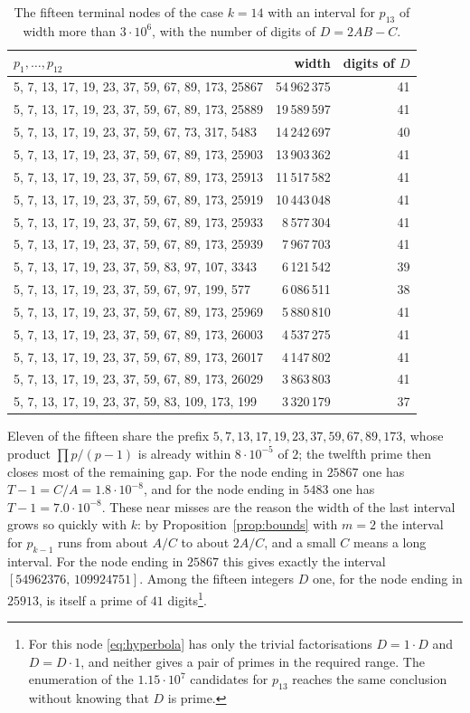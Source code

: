 \documentclass[11pt,reqno]{amsart}
\numberwithin{equation}{section}
\theoremstyle{plain}
\theoremstyle{definition}
\theoremstyle{remark}
\begin{document}
\begin{table}[ht]
\centering
\caption{The fifteen terminal nodes of the case $k=14$ with an interval
for $p_{13}$ of width more than $3\cdot10^6$, with the number of digits
of $D=2AB-C$.}
\label{tab:hard}
\smallskip
\small
\begin{tabular}{@{}lrr@{}}
\toprule
$p_1,\dots,p_{12}$ & width & digits of $D$ \\
\midrule
5, 7, 13, 17, 19, 23, 37, 59, 67, 89, 173, 25867  & 54\,962\,375 & 41 \\
5, 7, 13, 17, 19, 23, 37, 59, 67, 89, 173, 25889  & 19\,589\,597 & 41 \\
5, 7, 13, 17, 19, 23, 37, 59, 67, 73, 317, 5483   & 14\,242\,697 & 40 \\
5, 7, 13, 17, 19, 23, 37, 59, 67, 89, 173, 25903  & 13\,903\,362 & 41 \\
5, 7, 13, 17, 19, 23, 37, 59, 67, 89, 173, 25913  & 11\,517\,582 & 41 \\
5, 7, 13, 17, 19, 23, 37, 59, 67, 89, 173, 25919  & 10\,443\,048 & 41 \\
5, 7, 13, 17, 19, 23, 37, 59, 67, 89, 173, 25933  &  8\,577\,304 & 41 \\
5, 7, 13, 17, 19, 23, 37, 59, 67, 89, 173, 25939  &  7\,967\,703 & 41 \\
5, 7, 13, 17, 19, 23, 37, 59, 83, 97, 107, 3343   &  6\,121\,542 & 39 \\
5, 7, 13, 17, 19, 23, 37, 59, 67, 97, 199, 577    &  6\,086\,511 & 38 \\
5, 7, 13, 17, 19, 23, 37, 59, 67, 89, 173, 25969  &  5\,880\,810 & 41 \\
5, 7, 13, 17, 19, 23, 37, 59, 67, 89, 173, 26003  &  4\,537\,275 & 41 \\
5, 7, 13, 17, 19, 23, 37, 59, 67, 89, 173, 26017  &  4\,147\,802 & 41 \\
5, 7, 13, 17, 19, 23, 37, 59, 67, 89, 173, 26029  &  3\,863\,803 & 41 \\
5, 7, 13, 17, 19, 23, 37, 59, 83, 109, 173, 199   &  3\,320\,179 & 37 \\
\bottomrule
\end{tabular}
\end{table}

Eleven of the fifteen share the prefix
$5,7,13,17,19,23,37,59,67,89,173$, whose product
$\prod p/(p-1)$ is already within $8\cdot10^{-5}$ of $2$; the twelfth
prime then closes most of the remaining gap. For the node ending in
$25867$ one has $T-1=C/A=1.8\cdot10^{-8}$, and for the node ending in
$5483$ one has $T-1=7.0\cdot10^{-8}$. These near misses are the
reason the width of the last interval grows so quickly with $k$: by
Proposition~\ref{prop:bounds} with $m=2$ the interval for $p_{k-1}$
runs from about $A/C$ to about $2A/C$, and a small $C$ means a long
interval. For the node ending in $25867$ this gives exactly the
interval $[54962376,\,109924751]$. Among
the fifteen integers $D$ one, for the node ending in $25913$, is itself
a prime of $41$ digits\footnote{For this node \eqref{eq:hyperbola} has
only the trivial factorisations $D=1\cdot D$ and $D=D\cdot1$, and
neither gives a pair of primes in the required range. The enumeration
of the $1.15\cdot10^7$ candidates for $p_{13}$ reaches the same
conclusion without knowing that $D$ is prime.}.
\end{document}
